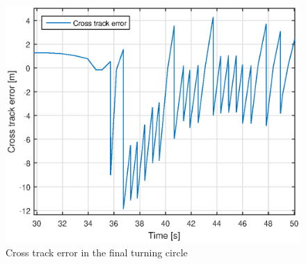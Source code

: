 \begin{figure}[H]
\centering
\includegraphics[scale=0.7]{figs/Experiment/CrossTrackError1juni083423.eps}
\caption{Cross track error in the final turning circle}
\label{Fig:CrossTrackError1juni083423}
\end{figure}
